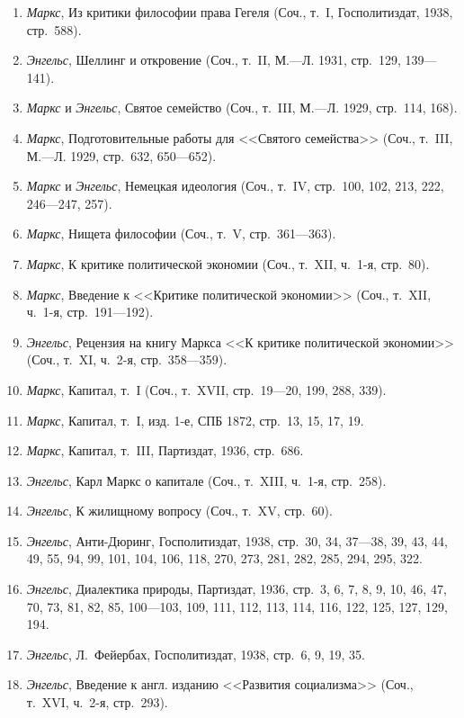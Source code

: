 \begin{enumerate}
\item {\em Маркс}, Из критики философии права Гегеля (Соч., т.~I,
Госполитиздат, 1938, стр.~588).
\item {\em Энгельс}, Шеллинг и откровение (Соч., т.~II, М.---Л. 1931,
стр.~129, 139---141).
\item {\em Маркс} и {\em Энгельс}, Святое семейство (Соч., т.~III, М.---Л.
1929, стр.~114, 168).
\item {\em Маркс}, Подготовительные работы для <<Святого семейства>> (Соч.,
т.~III, М.---Л. 1929, стр.~632, 650---652).
\item {\em Маркс} и {\em Энгельс},
Немецкая идеология (Соч., т.~IV, стр.~100, 102, 213, 222, 246---247, 257).
\item {\em Маркс}, Нищета философии (Соч., т.~V, стр.~361---363).
\item {\em Маркс}, К критике политической экономии (Соч., т.~XII, ч.~1-я,
стр.~80).
\item {\em Маркс}, Введение к <<Критике политической экономии>> (Соч., т.~XII,
ч.~1-я, стр.~191---192).
\item {\em Энгельс}, Рецензия на книгу Маркса <<К критике политической
экономии>> (Соч., т.~XI, ч.~2-я, стр.~358---359).
\item {\em Маркс}, Капитал, т.~I (Соч., т.~XVII, стр.~19---20, 199, 288, 339).
\item {\em Маркс}, Капитал, т.~I, изд. 1-е, СПБ 1872, стр.~13, 15, 17, 19.
\item {\em Маркс}, Капитал, т.~III, Партиздат, 1936, стр.~686.
\item {\em Энгельс}, Карл Маркс о капитале (Соч., т.~XIII, ч.~1-я, стр.~258).
\item {\em Энгельс}, К жилищному вопросу (Соч., т.~XV, стр.~60).
\item {\em Энгельс}, Анти-Дюринг, Госполитиздат, 1938, стр.~30, 34, 37---38,
39, 43, 44, 49, 55, 94, 99, 101, 104, 106, 118, 270, 273, 281, 282, 285, 294,
295, 322.
\item {\em Энгельс}, Диалектика природы, Партиздат, 1936, стр.~3, 6, 7, 8, 9, 10,
46, 47, 70, 73, 81, 82, 85, 100---103, 109, 111, 112, 113, 114, 116, 122,
125, 127, 129, 194.
\item {\em Энгельс}, Л.~Фейербах, Госполитиздат, 1938, стр.~6, 9, 19, 35.
\item {\em Энгельс}, Введение к англ. изданию <<Развития социализма>> (Соч.,
т.~XVI, ч.~2-я, стр.~293).
\end{enumerate}

